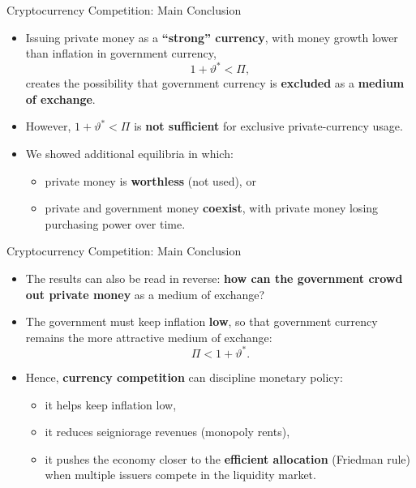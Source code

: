 \documentclass[11pt,aspectratio=169]{beamer}
\begin{document}
\begin{frame}{Cryptocurrency Competition: Main Conclusion}
\small
\begin{itemize}

    \item Issuing private money as a \textbf{``strong'' currency}, with money growth lower than inflation in government currency,
    \[
        1+\vartheta^\ast < \Pi,
    \]
    creates the possibility that government currency is \textbf{excluded} as a \textbf{medium of exchange}.

    \vspace{0.8em}

    \item However, $1+\vartheta^\ast < \Pi$ is \textbf{not sufficient} for exclusive private-currency usage.

    \vspace{0.8em}

    \item We showed additional equilibria in which:
    \begin{itemize}
        \item private money is \textbf{worthless} (not used), or
        \item private and government money \textbf{coexist}, with private money losing purchasing power over time.
    \end{itemize}

\end{itemize}
\end{frame}

\begin{frame}{Cryptocurrency Competition: Main Conclusion}
\small
\begin{itemize}

    \item The results can also be read in reverse:  
    \textbf{how can the government crowd out private money} as a medium of exchange?

    \vspace{0.8em}

    \item The government must keep inflation \textbf{low}, so that government currency remains the more attractive medium of exchange:
    \[
        \Pi < 1+\vartheta^\ast.
    \]

    \vspace{0.8em}

    \item Hence, \textbf{currency competition} can discipline monetary policy:
    \begin{itemize}
        \item it helps keep inflation low,
        \item it reduces seigniorage revenues (monopoly rents),
        \item it pushes the economy closer to the \textbf{efficient allocation} (Friedman rule) when multiple issuers compete in the liquidity market.
    \end{itemize}

\end{itemize}
\end{frame}
\end{document}
